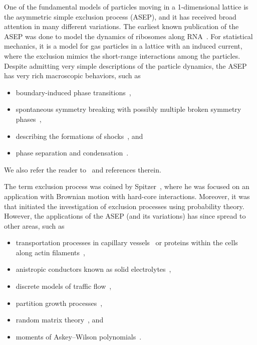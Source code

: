 \documentclass[reqno]{amsart}%
\newcommand{\0}{\phantom{c}}
\theoremstyle{plain}
\theoremstyle{definition}
\numberwithin{equation}{section}
\begin{document}
\label{sec:introduction}

One of the fundamental models of particles moving in a 1-dimensional lattice
is the asymmetric simple exclusion process (ASEP), and it has received broad
attention in many different variations. The earliest known publication of the
ASEP was done to model the dynamics of ribosomes along RNA~\cite{MGP68}. For
statistical mechanics, it is a model for gas particles in a lattice with an
induced current, where the exclusion mimics the short-range interactions among
the particles. Despite admitting very simple descriptions of the particle
dynamics, the ASEP has very rich macroscopic behaviors, such as

\begin{itemize}
\item boundary-induced phase transitions~\cite{Krug91},

\item spontaneous symmetry breaking with possibly multiple broken symmetry
phases~\cite{AHR98,AHR99,CEM01,EFGM95,EPSZ05,GLEMSS95,PK07},

\item describing the formations of
shocks~\cite{DJLS93,Ferrari92,FF94,FF94II,Liggett76}, and

\item phase separation and condensation~\cite{EKKM98,JNHWW09,KLMST02,RSS00}.
\end{itemize}

We also refer the reader to~\cite{PEM09,Schutz01,SZ95,TJHJ16} and references therein.

The term exclusion process was coined by Spitzer~\cite{Spitzer70}, where he
was focused on an application with Brownian motion with hard-core
interactions. Moreover, it was~\cite{Spitzer70} that initiated the
investigation of exclusion processes using probability theory. However, the
applications of the ASEP (and its variations) has since spread to other areas,
such as

\begin{itemize}
\item transportation processes in capillary vessels~\cite{Levitt73} or
proteins within the cells along actin filaments~\cite{KNL05},

\item anistropic conductors known as solid electrolytes~\cite{CL99},

\item discrete models of traffic flow~\cite{Schad01},

\item partition growth processes~\cite{Lam15},

\item random matrix theory~\cite{Johansson00,TW09}, and

\item moments of Askey--Wilson polynomials~\cite{CW11}.
\end{itemize}
\end{document}
